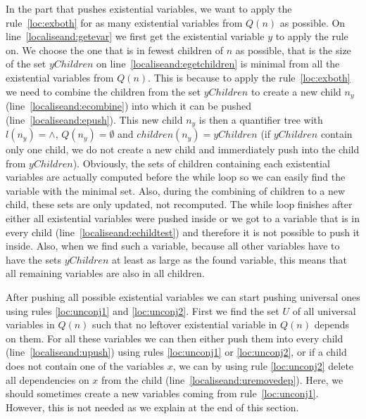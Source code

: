 \documentclass[
  digital, %
  color,
  twoside, %
  table,   %
  nolof,     %
  nolot,     %
]{fithesis3}
\theoremstyle{definition}
\theoremstyle{remark}
\newcommand{\prefix}[1]{Q({#1})}
\begin{document}
In the part that pushes existential variables, we want to apply the rule~\eqref{loc:exboth} for as many existential variables from $\prefix{n}$ as possible. On line~\ref{localiseand:getevar} we first get the existential variable $y$ to apply the rule on. We choose the one that is in fewest children of $n$ as possible, that is the size of the set $yChildren$ on line~\ref{localiseand:egetchildren} is minimal from all the existential variables from $\prefix{n}$. This is because to apply the rule~\eqref{loc:exboth} we need to combine the children from the set $yChildren$ to create a new child $n_y$ (line~\ref{localiseand:ecombine}) into which it can be pushed (line~\ref{localiseand:epush}). This new child $n_y$ is then a quantifier tree with $l(n_y) = {\land}$, $\prefix{n_y} = \emptyset$ and $children(n_y) = yChildren$ (if $yChildren$ contain only one child, we do not create a new child and immerdiately push into the child from $yChildren$). Obviously, the sets of children containing each existential variables are actually computed before the while loop so we can easily find the variable with the minimal set. Also, during the combining of children to a new child, these sets are only updated, not recomputed. The while loop finishes after either all existential variables were pushed inside or we got to a variable that is in every child (line~\ref{localiseand:echildtest}) and therefore it is not possible to push it inside. Also, when we find such a variable, because all other variables have to have the sets $yChildren$ at least as large as the found variable, this means that all remaining variables are also in all children.

After pushing all possible existential variables we can start pushing universal ones using rules \eqref{loc:unconj1} and \eqref{loc:unconj2}. First we find the set $U$ of all universal variables in $\prefix{n}$ such that no leftover existential variable in $\prefix{n}$ depends on them. For all these variables we can then either push them into every child (line~\ref{localiseand:upush}) using rules \eqref{loc:unconj1} or \eqref{loc:unconj2}, or if a child does not contain one of the variables $x$, we can by using rule \eqref{loc:unconj2} delete all dependencies on $x$ from the child (line~\ref{localiseand:uremovedep}). Here, we should sometimes create a new variables coming from rule~\eqref{loc:unconj1}. However, this is not needed as we explain at the end of this section.
\end{document}
